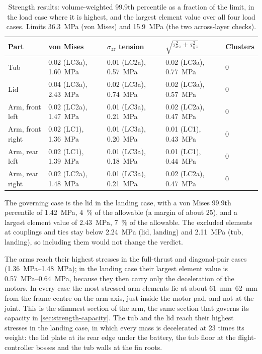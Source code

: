 \begin{table}[htbp]
\centering\footnotesize
\caption{Strength results: volume-weighted 99.9th percentile as a fraction of the limit, in the load case where it is highest, and the largest element value over all four load cases. Limits \SI{36.3}{MPa} (von Mises) and \SI{15.9}{MPa} (the two across-layer checks).}\label{tab:strength-results}
\setlength{\tabcolsep}{3pt}
\begin{tabular}{@{}lllll@{}}
\toprule
Part & von Mises & $\sigma_{zz}$ tension & $\sqrt{\tau_{xz}^2+\tau_{yz}^2}$ & Clusters\\
\midrule
Tub & 0.02 (LC3a), \SI{1.60}{MPa} & 0.01 (LC2a), \SI{0.57}{MPa} & 0.02 (LC3a), \SI{0.77}{MPa} & 0\\
Lid & 0.04 (LC3a), \SI{2.43}{MPa} & 0.02 (LC3a), \SI{0.74}{MPa} & 0.02 (LC3a), \SI{0.57}{MPa} & 0\\
Arm, front left & 0.02 (LC2a), \SI{1.47}{MPa} & 0.01 (LC3a), \SI{0.21}{MPa} & 0.02 (LC2a), \SI{0.47}{MPa} & 0\\
Arm, front right & 0.02 (LC1), \SI{1.36}{MPa} & 0.01 (LC3a), \SI{0.20}{MPa} & 0.01 (LC1), \SI{0.43}{MPa} & 0\\
Arm, rear left & 0.02 (LC1), \SI{1.39}{MPa} & 0.01 (LC3a), \SI{0.18}{MPa} & 0.01 (LC1), \SI{0.44}{MPa} & 0\\
Arm, rear right & 0.02 (LC2a), \SI{1.48}{MPa} & 0.01 (LC3a), \SI{0.21}{MPa} & 0.02 (LC2a), \SI{0.47}{MPa} & 0\\
\bottomrule
\end{tabular}
\end{table}

The governing case is the lid in the landing case, with a von Mises 99.9th percentile of \SI{1.42}{MPa}, \SI{4}{\percent} of the allowable (a margin of about 25), and a largest element value of \SI{2.43}{MPa}, \SI{7}{\percent} of the allowable. The excluded elements at couplings and ties stay below \SI{2.24}{MPa} (lid, landing) and \SI{2.11}{MPa} (tub, landing), so including them would not change the verdict.

The arms reach their highest stresses in the full-thrust and diagonal-pair cases (\SIrange{1.36}{1.48}{MPa}); in the landing case their largest element value is \SIrange{0.57}{0.64}{MPa}, because they then carry only the deceleration of the motors. In every case the most stressed arm elements lie at about \SIrange{61}{62}{mm} from the frame centre on the arm axis, just inside the motor pad, and not at the joint. This is the slimmest section of the arm, the same section that governs its capacity in \cref{sec:strength-capacity}. The tub and the lid reach their highest stresses in the landing case, in which every mass is decelerated at 23 times its weight: the lid plate at its rear edge under the battery, the tub floor at the flight-controller bosses and the tub walls at the fin roots.


